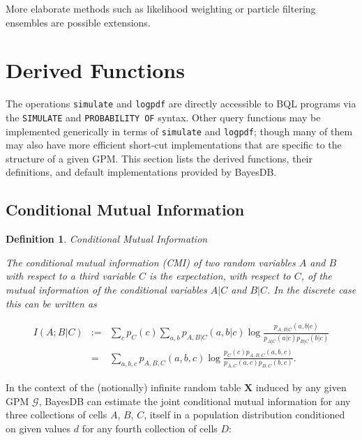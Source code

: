 \documentclass[10pt,letterpaper]{article}
\newtheorem{definition}{Definition}[section]
\newcommand{\G}{\mathcal{G}}
\begin{document}
More elaborate methods such as likelihood weighting or particle
filtering ensembles are possible extensions.

\section{Derived Functions}

The operations \texttt{simulate} and \texttt{logpdf} are directly
accessible to BQL programs via the \texttt{SIMULATE} and
\texttt{PROBABILITY OF} syntax.  Other query functions may be
implemented generically in terms of \texttt{simulate} and
\texttt{logpdf}; though many of them may also have more efficient
short-cut implementations that are specific to the structure of a
given GPM.  This section lists the derived functions, their
definitions, and default implementations provided by BayesDB.


\subsection{Conditional Mutual Information}

\begin{definition} Conditional Mutual Information 

The \emph{conditional mutual information} (CMI) of two random variables $A$
and $B$ with respect to a third variable $C$ is the expectation, with
respect to $C$, of the mutual information of the conditional variables
$A|C$ and $B|C$.  In the discrete case this can be written as

    \begin{eqnarray*}
    I(A;B|C) & := &
        \sum_c p_C(c) \sum_{a,b} p_{A,B|C}(a,b|c) \log
            \frac{p_{A,B|C}(a,b|c)}{p_{A|C}(a|c) p_{B|C}(b|c)} \\
    &=& \sum_{a,b,c} p_{A,B,C}(a,b,c) \log
            \frac{p_C(c) p_{A,B,C}(a,b,c)}{p_{A,C}(a,c) p_{B,C}(b,c)}.
    \end{eqnarray*}

\end{definition}

In the context of the (notionally) infinite random table $\mathbf{X}$
induced by any given GPM $\G$,
BayesDB can estimate the joint conditional mutual information for any
three collections of cells $A$, $B$, $C$, itself in a population distribution
conditioned on given values $d$ for any fourth collection of cells $D$:
\end{document}
